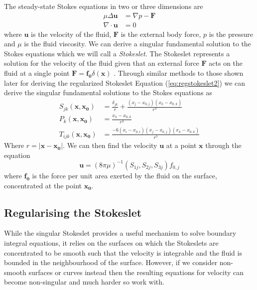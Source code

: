 The steady-state Stokes equations in two or three dimensions are
\begin{subequations}
\label{eq:StokesFlow}
\begin{align}
    \mu\Delta\boldsymbol{u} &= \nabla p - \boldsymbol{F} \label{eq:StokesFlow1} \\
    \nabla \cdot \boldsymbol{u} &= 0 \label{eq:StokesFlow2}
\end{align}
\end{subequations}
where $\mathbf{u}$ is the velocity of the fluid, $\mathbf{F}$ is the external body force, $p$ is the pressure and $\mu$ is the fluid viscosity.
We can derive a singular fundamental solution to the Stokes equations which we will call a \textit{Stokeslet}. The Stokeslet represents a solution for the velocity of the fluid given that an external force $\mathbf{F}$ acts on the fluid at a single point $\mathbf{F} = \mathbf{f_0}\delta(\mathbf{x})$ \cite{Hancock1953TheLiquids, Batchelor2000AnDynamics, Pozrikidis1992BoundaryFlow}.
Through similar methods to those shown later for deriving the regularized Stokeslet Equation (\cref{eq:regstokeslet2}) we can derive the singular fundamental solutions to the Stokes equations as
\begin{equation}
\label{eq:singularsolutions}
\begin{aligned}
    S_{j k}(\mathbf{x}, \mathbf{x_0}) &= \frac{\delta_{j k}}{r}+\frac{\left(x_{j}-x_{0,j}\right)\left(x_{k}-x_{0,k}\right)}{r^{3}} \\
    P_{k}(\mathbf{x}, \mathbf{x_0}) &= \frac{x_{k}-x_{0,k}}{r^{3}} \\
    T_{ijk}(\mathbf{x}, \mathbf{x_0}) &= \frac{-6\left(x_{i}-x_{0,i}\right)\left(x_{j}-x_{0,j}\right)\left(x_{k}-x_{0,k}\right)}{r^5}
\end{aligned}
\end{equation}
Where $r=|\mathbf{x}-\mathbf{x_0}|$. We can then find the velocity $\mathbf{u}$ at a point $\mathbf{x}$ through the equation
\begin{equation*}
    \mathbf{u} = (8 \pi \mu)^{-1} \left(S_{1j},S_{2j},S_{3j}\right)f_{0,j}
\end{equation*}
where $\mathbf{f_{0}}$ is the force per unit area exerted by the fluid on the surface, concentrated at the point $\mathbf{x_0}$.


\subsection{Regularising the Stokeslet}
While the singular Stokeslet provides a useful mechanism to solve boundary integral equations, it relies on the surfaces on which the Stokeslets are concentrated to be smooth such that the velocity is integrable and the fluid is bounded in the neighbourhood of the surface. However, if we consider non-smooth surfaces or curves instead then the resulting equations for velocity can become non-singular and much harder so work with.

